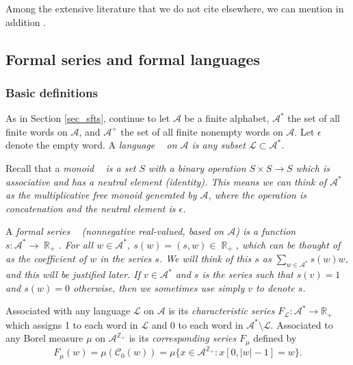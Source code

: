 \documentclass{kepart2010}
\theoremstyle{plain}
\theoremstyle{definition}
\theoremstyle{remark}
\theoremstyle{definition}
\numberwithin{equation}{section}
\begin{document}
Among the extensive literature that we do not cite elsewhere, we can
mention in addition \cite{Harris1955,Nasu1985,Fannes1992,
BezhaevaOseledets2005,Schonhuth2009}.

\subsection{Formal series  and formal languages}\label{sec_lang}

\subsubsection{Basic definitions}

As in Section \ref{sec_sfts}, continue to let ${{\mathcal A}}$ be a finite
alphabet, ${{\mathcal A}}^{*}$ the set of all finite words on ${{\mathcal A}}$, and
${{\mathcal A}}^{+}$ the set of all finite nonempty words on ${{\mathcal A}}$. Let
$\epsilon$ denote the empty word.  A \em language \em~ on ${{\mathcal A}}$ is
any subset $\mathcal{L}\subset {{\mathcal A}}^{*}$.

Recall that a \em monoid \em~ is a set $S$ with a binary operation
$S \times S \rightarrow S$ which is associative and has a neutral
element (identity).  This means we can think of ${{\mathcal A}}^{*}$ as the
multiplicative free monoid generated by ${{\mathcal A}}$, where the operation
is concatenation and the neutral element is $\epsilon$.

A \em formal series \em~ (nonnegative real-valued, based on ${{\mathcal A}}$)
is a function $s: {{\mathcal A}}^{*} \rightarrow \operatorname{\mathbb R}_{+}$. For all $ w \in
{{\mathcal A}}^{*}, \: s(w)=(s, w) \in \operatorname{\mathbb R}_{+}$, which can be thought of as
the coefficient of $w$ in the series $s$.  We will think of this $s$
as $\sum_{w\in {{\mathcal A}}^{*}}s(w)w$, and this will be justified later. If
$v\in {{\mathcal A}}^{*}$ and $s$ is the series such that $s(v)=1$ and $s(w)=0$
otherwise, then we sometimes use simply
 $v$ to denote  $s$.

Associated with any language ${{\mathcal L}}$ on ${{\mathcal A}}$ is its {\em
characteristic series} $F_{{\mathcal L}} :{{\mathcal A}}^* \to {\mathbb R}_+$ which assigns 1 to
each word in ${{\mathcal L}}$ and 0 to each word in ${{\mathcal A}}^* \setminus {{\mathcal L}}$.
Associated to any Borel measure $\mu$ on ${{\mathcal A}}^{{\mathbb Z}_+}$ is its {\em
corresponding series} $F_\mu$ defined by
 \begin{equation}
 F_\mu(w) = \mu({{\mathcal C}}_0(w)) = \mu\{x \in {{\mathcal A}}^{{\mathbb Z}_+}: x[0,|w|-1]=w\} .
 \end{equation}
\end{document}
